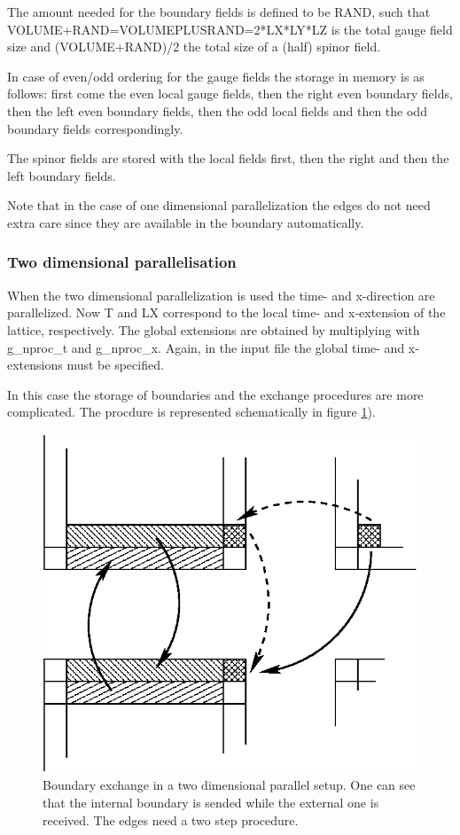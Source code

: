 The amount needed for the boundary fields is defined to be {\ttfamily
  RAND}, such that {\ttfamily VOLUME+RAND=VOLUMEPLUSRAND=2*LX*LY*LZ}
is the total gauge field size and {\ttfamily (VOLUME+RAND)/2} the
total size of a (half) spinor field. 

In case of even/odd ordering for the gauge fields the storage in
memory is as follows: first come the even local gauge fields, then the
right even boundary fields, then the left even boundary fields, then
the odd local fields and then the odd boundary fields correspondingly.

The spinor fields are stored with the local fields first, then the
right and then the left boundary fields.  

Note that in the case of one dimensional parallelization the edges do
not need extra care since they are available in the boundary
automatically. 

\subsubsection{Two dimensional parallelisation}

When the two dimensional parallelization is used the time- and
x-direction are parallelized. Now {\ttfamily T} and {\ttfamily LX}
correspond to the local time- and x-extension of the lattice,
respectively. The global extensions are obtained by multiplying with
{\ttfamily g\_nproc\_t} and {\ttfamily g\_nproc\_x}. Again, in the
input file the global time- and x-extensions must be specified. 

In this case the storage of boundaries and the exchange procedures are
more complicated. The procdure is represented schematically in figure
\ref{fig:partition}). 

\begin{figure}[htbp]
\centering
\includegraphics[width=0.65\linewidth]{partition}
\caption{Boundary exchange in a two dimensional parallel setup. One
  can see that the internal boundary is sended while the external one
  is received. The edges need a two step procedure.}
\label{fig:partition}
\end{figure}


